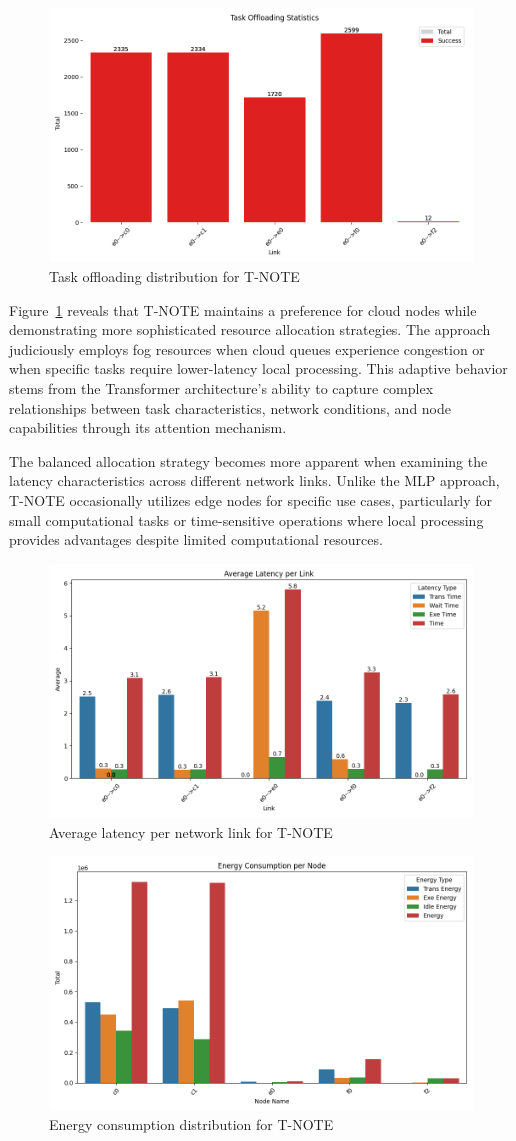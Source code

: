 \documentclass[preprint,3p,authoryear]{elsarticle}
\begin{document}
\begin{figure}[H]
    \centering
    \includegraphics[width=0.5\linewidth]{figs/T-NOTE/task_offloading_statistics.png}
    \caption{Task offloading distribution for T-NOTE}
    \label{fig:T-NOTE-offloading-stats}
\end{figure}

Figure~\ref{fig:T-NOTE-offloading-stats} reveals that T-NOTE maintains a preference for cloud nodes while demonstrating more sophisticated resource allocation strategies. The approach judiciously employs fog resources when cloud queues experience congestion or when specific tasks require lower-latency local processing. This adaptive behavior stems from the Transformer architecture's ability to capture complex relationships between task characteristics, network conditions, and node capabilities through its attention mechanism.

The balanced allocation strategy becomes more apparent when examining the latency characteristics across different network links. Unlike the MLP approach, T-NOTE occasionally utilizes edge nodes for specific use cases, particularly for small computational tasks or time-sensitive operations where local processing provides advantages despite limited computational resources.

\begin{figure}[H]
    \centering
    \includegraphics[width=0.5\linewidth]{figs/T-NOTE/avg_latency_per_link.png}
    \caption{Average latency per network link for T-NOTE}
    \label{fig:T-NOTE-avg-latency}
\end{figure}

\begin{figure}[H]
    \centering
    \includegraphics[width=0.5\linewidth]{figs/T-NOTE/energy_consumption_per_node.png}
    \caption{Energy consumption distribution for T-NOTE}
    \label{fig:T-NOTE-energy-consumption}
\end{figure}
\end{document}
